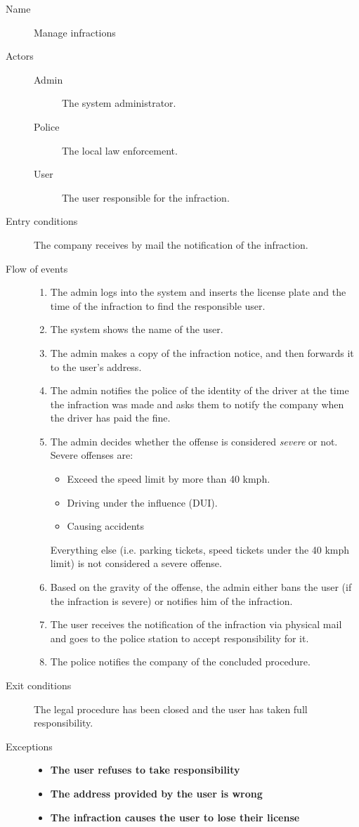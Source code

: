 		\begin{description}
			\item[Name] Manage infractions
			\item[Actors] \hfill
				\begin{description}
					\item[Admin] The system administrator.
					\item[Police] The local law enforcement.
					\item[User] The user responsible for the infraction.
				\end{description}
			\item[Entry conditions] The company receives by mail the notification of the infraction.
			\item[Flow of events] \hfill
				\begin{enumerate}
					\item The admin logs into the system and inserts the license plate and the time of the infraction to find the responsible user.
					\item The system shows the name of the user.
					\item The admin makes a copy of the infraction notice, and then forwards it to the user's address.
					\item The admin notifies the police of the identity of the driver at the time the infraction was made and asks them to notify the company when the driver has paid the fine.
					\item The admin decides whether the offense is considered \textit{severe} or not. Severe offenses are:
						\begin{itemize}
							\item Exceed the speed limit by more than 40 kmph.
							\item Driving under the influence (DUI).
							\item Causing accidents %
						\end{itemize}
						Everything else (i.e. parking tickets, speed tickets under the 40 kmph limit) is not considered a severe offense.
					\item Based on the gravity of the offense, the admin either bans the user (if the infraction is severe) or notifies him of the infraction.
					\item The user receives the notification of the infraction via physical mail and goes to the police station to accept responsibility for it.
					\item The police notifies the company of the concluded procedure.
				\end{enumerate}
			\item[Exit conditions] The legal procedure has been closed and the user has taken full responsibility.
			\item[Exceptions] \hfill
				\begin{itemize} %
					\item \textbf{The user refuses to take responsibility}
					\item \textbf{The address provided by the user is wrong}
					\item \textbf{The infraction causes the user to lose their license}
				\end{itemize}
		\end{description}
